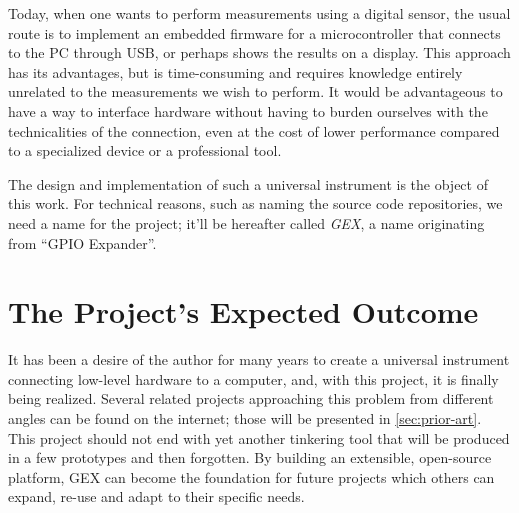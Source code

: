 Today, when one wants to perform measurements using a digital sensor, the usual route is to implement an embedded firmware for a microcontroller that connects to the \gls{PC} through \gls{USB}, or perhaps shows the results on a display. This approach has its advantages, but is time-consuming and requires knowledge entirely unrelated to the measurements we wish to perform. It would be advantageous to have a way to interface hardware without having to burden ourselves with the technicalities of the connection, even at the cost of lower performance compared to a specialized device or a professional tool.

The design and implementation of such a universal instrument is the object of this work. For technical reasons, such as naming the source code repositories, we need a name for the project; it'll be hereafter called \textit{GEX}, a name originating from ``GPIO Expander''.

\section{The Project's Expected Outcome}\label{sec:expected-outcome}

It has been a desire of the author for many years to create a universal instrument connecting low-level hardware to a computer, and, with this project, it is finally being realized. Several related projects approaching this problem from different angles can be found on the internet; those will be presented in \cref{sec:prior-art}. This project should not end with yet another tinkering tool that will be produced in a few prototypes and then forgotten. By building an extensible, open-source platform, GEX can become the foundation for future projects which others can expand, re-use and adapt to their specific needs.

